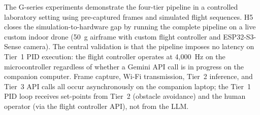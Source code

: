 %
%
%
%

The G-series experiments demonstrate the four-tier pipeline in a controlled
laboratory setting using pre-captured frames and simulated flight sequences.
H5 closes the simulation-to-hardware gap by running the complete pipeline on
a live custom indoor drone (50~g airframe with custom flight controller and
ESP32-S3-Sense camera). The central validation is that the pipeline imposes
no latency on Tier~1 PID execution: the flight controller operates at 4,000~Hz
on the microcontroller regardless of whether a Gemini API call is in progress
on the companion computer. Frame capture, Wi-Fi transmission, Tier~2 inference,
and Tier~3 API calls all occur asynchronously on the companion laptop; the Tier~1
PID loop receives set-points from Tier~2 (obstacle avoidance) and the human
operator (via the flight controller API), not from the LLM.

